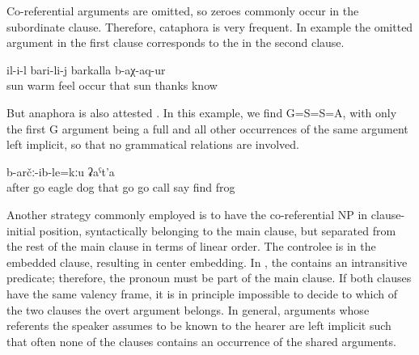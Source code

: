 Co-referential arguments are omitted, so zeroes commonly occur in the subordinate clause. Therefore, cataphora is very frequent. In example  the omitted argument in the first clause corresponds to the  in the second clause.
%
\begin{exe}
	\ex	\label{ex:When he felt the warmth of the sun, he thanked the sun@35}
		il-i-l	bari-li-j	barkalla 	b-aχ-aq-ur\\
		sun	warm	feel occur	that	sun		thanks 	know\\
	\glt	{} 
\end{exe}

But anaphora is also attested . In this example, we find G=S=S=A, with only the first G argument being a full  and all other occurrences of the same argument left implicit, so that no grammatical relations are involved.
%
\begin{exe}
	\ex	\label{ex:The bird run (i.e. flies) after him and his dog, and they run and run, and shout, but they did not find the frog@36}
	\gll	[hitːi	b-uq-un-ne	č'aka	χːʷe-j=ra	hel-i-j=ra]	[sa-r-b-uq-un-ne,	sa-r-b-uq-un-ne] 	[waˁw b-ik'-ul]	b-arčː-ib-le=kːu	ʡaˁt'a\\
		after	go	eagle	dog	that	go	go	call say	find	frog\\
	\glt	{}
\end{exe}

Another strategy commonly employed is to have the co-referential NP in clause-initial position, syntactically belonging to the main clause, but separated from the rest of the main clause in terms of linear order. The controlee is in the embedded clause, resulting in center embedding. In , the  contains an intransitive predicate; therefore, the pronoun   must be part of the main clause. If both clauses have the same valency frame, it is in principle impossible to decide to which of the two clauses the overt argument belongs. In general, arguments whose referents the speaker assumes to be known to the hearer are left implicit such that often none of the clauses contains an occurrence of the shared arguments.

